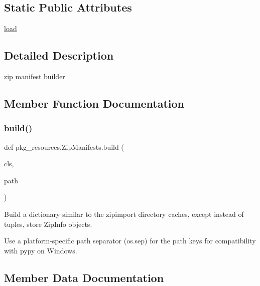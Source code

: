 \subsection*{Static Public Attributes}
\begin{DoxyCompactItemize}
\item 
\hyperlink{classpkg__resources_1_1ZipManifests_ad5c645f8502e06b9c45014a1f8cce637}{load}
\end{DoxyCompactItemize}


\subsection{Detailed Description}
\begin{DoxyVerb}zip manifest builder
\end{DoxyVerb}
 

\subsection{Member Function Documentation}
\mbox{\label{classpkg__resources_1_1ZipManifests_abe93fa68a3c85fc254dc117af87a0703}} 
\subsubsection{\texorpdfstring{build()}{build()}}
{\footnotesize\ttfamily def pkg\+\_\+resources.\+Zip\+Manifests.\+build (\begin{DoxyParamCaption}\item[{}]{cls,  }\item[{}]{path }\end{DoxyParamCaption})}

\begin{DoxyVerb}Build a dictionary similar to the zipimport directory
caches, except instead of tuples, store ZipInfo objects.

Use a platform-specific path separator (os.sep) for the path keys
for compatibility with pypy on Windows.
\end{DoxyVerb}
 

\subsection{Member Data Documentation}
\mbox{\label{classpkg__resources_1_1ZipManifests_ad5c645f8502e06b9c45014a1f8cce637}} 
